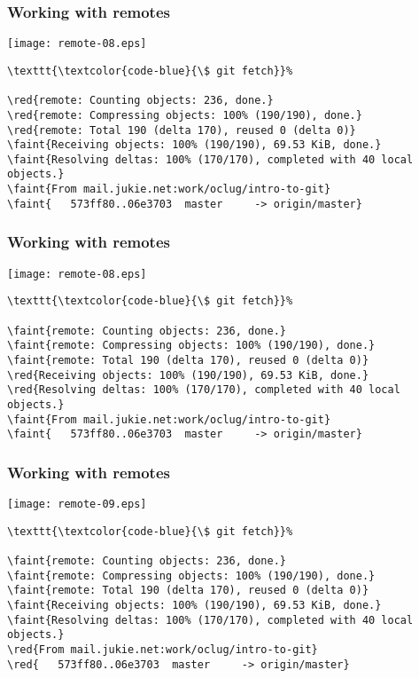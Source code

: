 \documentclass[english]{beamer}
\newcommand{\CMD}[1]{%
\texttt{\textcolor{code-blue}{#1}}%
}
\newcommand{\faint}[1]{%
\textcolor{code-gray}{#1}%
}
\newcommand{\red}[1]{%
\textcolor{code-red}{#1}%
}
\begin{document}
\begin{frame}[fragile]
\frametitle{Working with remotes}

\texttt{[image: remote-08.eps]}

{\tiny
\begin{Verbatim}[commandchars=\\\{\}]
\CMD{\$ git fetch}
\red{remote: Counting objects: 236, done.}
\red{remote: Compressing objects: 100% (190/190), done.}
\red{remote: Total 190 (delta 170), reused 0 (delta 0)}
\faint{Receiving objects: 100% (190/190), 69.53 KiB, done.}
\faint{Resolving deltas: 100% (170/170), completed with 40 local objects.}
\faint{From mail.jukie.net:work/oclug/intro-to-git}
\faint{   573ff80..06e3703  master     -> origin/master}
\end{Verbatim}
}
\vspace{\textheight}
\end{frame}

\begin{frame}[fragile]
\frametitle{Working with remotes}

\texttt{[image: remote-08.eps]}

{\tiny
\begin{Verbatim}[commandchars=\\\{\}]
\CMD{\$ git fetch}
\faint{remote: Counting objects: 236, done.}
\faint{remote: Compressing objects: 100% (190/190), done.}
\faint{remote: Total 190 (delta 170), reused 0 (delta 0)}
\red{Receiving objects: 100% (190/190), 69.53 KiB, done.}
\red{Resolving deltas: 100% (170/170), completed with 40 local objects.}
\faint{From mail.jukie.net:work/oclug/intro-to-git}
\faint{   573ff80..06e3703  master     -> origin/master}
\end{Verbatim}
}
\vspace{\textheight}
\end{frame}

\begin{frame}[fragile]
\frametitle{Working with remotes}

\texttt{[image: remote-09.eps]}

{\tiny
\begin{Verbatim}[commandchars=\\\{\}]
\CMD{\$ git fetch}
\faint{remote: Counting objects: 236, done.}
\faint{remote: Compressing objects: 100% (190/190), done.}
\faint{remote: Total 190 (delta 170), reused 0 (delta 0)}
\faint{Receiving objects: 100% (190/190), 69.53 KiB, done.}
\faint{Resolving deltas: 100% (170/170), completed with 40 local objects.}
\red{From mail.jukie.net:work/oclug/intro-to-git}
\red{   573ff80..06e3703  master     -> origin/master}
\end{Verbatim}
}
\vspace{\textheight}
\end{frame}
\end{document}
